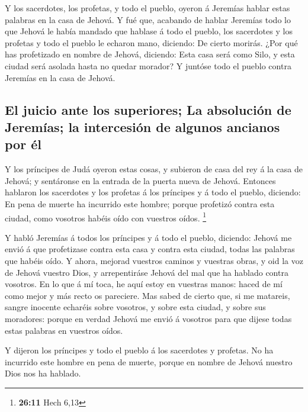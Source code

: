  Y los sacerdotes, los profetas, y todo el pueblo, oyeron á
Jeremías hablar estas palabras en la casa de Jehová.  Y fué
que, acabando de hablar Jeremías todo lo que Jehová le había mandado que
hablase á todo el pueblo, los sacerdotes y los profetas y todo el pueblo
le echaron mano, diciendo: De cierto morirás.  ¿Por qué has
profetizado en nombre de Jehová, diciendo: Esta casa será como Silo, y
esta ciudad será asolada hasta no quedar morador? Y juntóse todo el
pueblo contra Jeremías en la casa de Jehová.

\hypertarget{el-juicio-ante-los-superiores-la-absoluciuxf3n-de-jeremuxedas-la-intercesiuxf3n-de-algunos-ancianos-por-uxe9l}{%
\subsection{El juicio ante los superiores; La absolución de Jeremías; la
intercesión de algunos ancianos por
él}\label{el-juicio-ante-los-superiores-la-absoluciuxf3n-de-jeremuxedas-la-intercesiuxf3n-de-algunos-ancianos-por-uxe9l}}

 Y los príncipes de Judá oyeron estas cosas, y subieron de
casa del rey á la casa de Jehová; y sentáronse en la entrada de la
puerta nueva de Jehová.  Entonces hablaron los sacerdotes y
los profetas á los príncipes y á todo el pueblo, diciendo: En pena de
muerte ha incurrido este hombre; porque profetizó contra esta ciudad,
como vosotros habéis oído con vuestros oídos. \footnote{\textbf{26:11}
  Hech 6,13}

 Y habló Jeremías á todos los príncipes y á todo el pueblo,
diciendo: Jehová me envió á que profetizase contra esta casa y contra
esta ciudad, todas las palabras que habéis oído.  Y ahora,
mejorad vuestros caminos y vuestras obras, y oid la voz de Jehová
vuestro Dios, y arrepentiráse Jehová del mal que ha hablado contra
vosotros.  En lo que á mí toca, he aquí estoy en vuestras
manos: haced de mí como mejor y más recto os pareciere. 
Mas sabed de cierto que, si me matareis, sangre inocente echaréis sobre
vosotros, y sobre esta ciudad, y sobre sus moradores: porque en verdad
Jehová me envió á vosotros para que dijese todas estas palabras en
vuestros oídos.

 Y dijeron los príncipes y todo el pueblo á los sacerdotes
y profetas. No ha incurrido este hombre en pena de muerte, porque en
nombre de Jehová nuestro Dios nos ha hablado.

